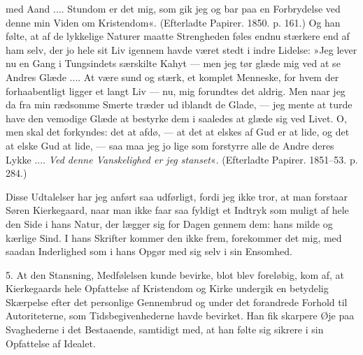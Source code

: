 \documentclass[12pt,a4paper,openany]{book}
\newcommand{\opage}[1]{\marginnote{\footnotesize\textit{[#1]}}}
\begin{document}
med Aand .... Stundom er det mig, som gik jeg
og bar paa en Forbrydelse ved denne min Viden om
Kristendom«. (Efterladte Papirer. 1850. p. 161.) Og
han følte, at af de lykkelige Naturer maatte Strengheden
føles endnu stærkere end af ham selv, der jo hele sit Liv
igennem havde været stedt i indre Lidelse: »Jeg lever
nu en Gang i Tungsindets særskilte Kahyt --- men jeg
tør glæde mig ved at se Andres Glæde .... At være
\opage{138}sund og stærk, et komplet Menneske, for hvem der forhaabentligt
ligger et langt Liv --- nu, mig forundtes det
aldrig. Men naar jeg da fra min rædsomme Smerte
træder ud iblandt de Glade, --- jeg mente at turde have
den vemodige Glæde at bestyrke dem i saaledes at glæde
sig ved Livet. O, men skal det forkyndes: det at afdø,
--- at det at elskes af Gud er at lide, og det at elske
Gud at lide, --- saa maa jeg jo lige som forstyrre alle de
Andre deres Lykke .... \textit{Ved denne Vanskelighed er jeg
stanset}«. (Efterladte Papirer. 1851--53. p. 284.)

Disse Udtalelser har jeg anført saa udførligt, fordi
jeg ikke tror, at man forstaar Søren Kierkegaard, naar
man ikke faar saa fyldigt et Indtryk som muligt af hele
den Side i hans Natur, der lægger sig for Dagen gennem
dem: hans milde og kærlige Sind. I hans Skrifter kommer
den ikke frem, forekommer det mig, med saadan
Inderlighed som i hans Opgør med sig selv i sin Ensomhed.

5. At den Stansning, Medfølelsen kunde bevirke,
blot blev foreløbig, kom af, at Kierkegaards hele Opfattelse
af Kristendom og Kirke undergik en betydelig
Skærpelse efter det personlige Gennembrud og under det
forandrede Forhold til Autoriteterne, som Tidsbegivenhederne
havde bevirket. Han fik skarpere Øje paa Svaghederne
i det Bestaaende, samtidigt med, at han følte sig
sikrere i sin Opfattelse af Idealet.
\end{document}
